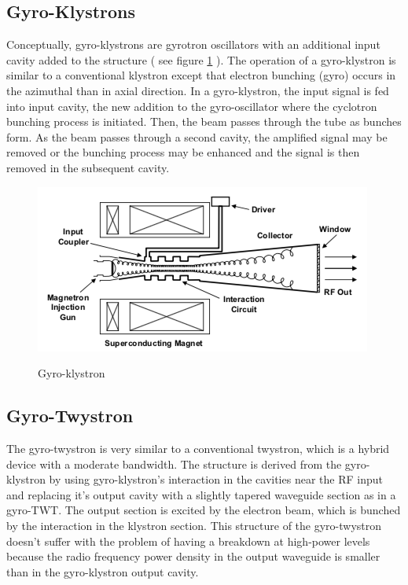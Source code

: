\subsection{Gyro-Klystrons}
Conceptually, gyro-klystrons are gyrotron oscillators with an additional input cavity added to the structure ( see figure \ref{fig:gky} ). The operation of a gyro-klystron is similar to a conventional klystron except that electron bunching (gyro) occurs in the azimuthal than in axial direction. In a gyro-klystron,  the input signal is fed into input cavity, the new addition to the gyro-oscillator where the cyclotron bunching process is initiated. Then, the beam passes through the tube as bunches form. As the beam passes through a second cavity, the amplified signal may be removed or the bunching process may be enhanced and the signal is then removed in the subsequent cavity.

\begin{figure}[H]
\centering
\includegraphics[scale=0.8]{images/gyro_klystron}
\label{fig:gky}
\caption{Gyro-klystron}
\end{figure}

\subsection{Gyro-Twystron}
The gyro-twystron is very similar to a conventional twystron, which is a hybrid device with a moderate bandwidth. The structure is derived from the gyro-klystron by using gyro-klystron's interaction in the cavities near the RF input and replacing it's output cavity with a slightly tapered waveguide section as in a gyro-TWT. The output section is excited by the electron beam, which is bunched by the interaction in the klystron section. This structure of the gyro-twystron doesn't suffer with the problem of having a breakdown at high-power levels because the radio frequency power density in the output waveguide is smaller than in the gyro-klystron output cavity.

